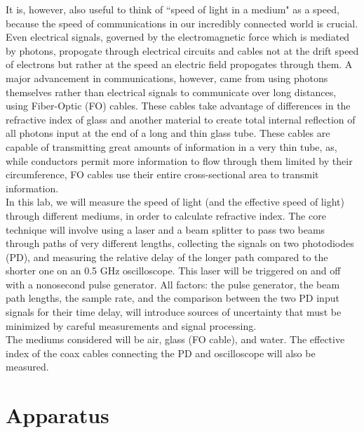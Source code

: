 \documentclass[aps,prl,reprint]{revtex4-2}
\begin{document}
It is, however, also useful to think of ``speed of light in a medium" as a speed, 
because the speed of communications in our incredibly connected world is crucial. 
Even electrical signals, governed by the electromagnetic force which is mediated by
photons, propogate through electrical circuits and cables not at the drift speed of
electrons but rather at the speed an electric field propogates through them. A major
advancement in communications, however, came from using photons themselves rather
than electrical signals to communicate over long distances, using Fiber-Optic (FO) 
cables. These cables take advantage of differences in the refractive index of glass
and another material to create total internal reflection of all photons input at the
end of a long and thin glass tube. These cables are capable of transmitting great 
amounts of information in a very thin tube, as, while conductors permit more 
information to flow through them limited by their circumference, FO cables use their
entire cross-sectional area to transmit information. \\

In this lab, we will measure the speed of light (and the effective speed of light) 
through different mediums, in order to calculate refractive index. The core technique
will involve using a laser and a beam splitter to pass two beams through paths of 
very different lengths, collecting the signals on two photodiodes (PD), and measuring
the relative delay of the longer path compared to the shorter one on an 0.5 GHz
oscilloscope. This laser will be triggered on and off with a nonosecond pulse 
generator. All factors: the pulse generator, the beam path lengths, the sample rate,
and the comparison between the two PD input signals for their time delay, will 
introduce sources of uncertainty that must be minimized by careful measurements and
signal processing. \\

The mediums considered will be air, glass (FO cable), and water. The effective 
index of the coax cables connecting the PD and oscilloscope will also be measured.


\section{Apparatus}
\end{document}
